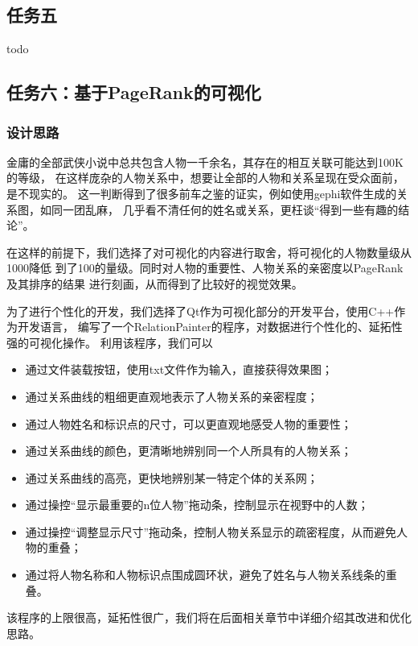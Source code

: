 \documentclass[a4paper,UTF8]{article}
\numberwithin{equation}{section}
\begin{document}
\subsection{任务五}
todo

\subsection{任务六：基于PageRank的可视化}
\subsubsection{设计思路}
金庸的全部武侠小说中总共包含人物一千余名，其存在的相互关联可能达到100K的等级，
在这样庞杂的人物关系中，想要让全部的人物和关系呈现在受众面前，是不现实的。
这一判断得到了很多前车之鉴的证实，例如使用gephi软件生成的关系图，如同一团乱麻，
几乎看不清任何的姓名或关系，更枉谈“得到一些有趣的结论”。
\par 在这样的前提下，我们选择了对可视化的内容进行取舍，将可视化的人物数量级从1000降低
到了100的量级。同时对人物的重要性、人物关系的亲密度以PageRank及其排序的结果
进行刻画，从而得到了比较好的视觉效果。
\par 为了进行个性化的开发，我们选择了Qt作为可视化部分的开发平台，使用C++作为开发语言，
编写了一个RelationPainter的程序，对数据进行个性化的、延拓性强的可视化操作。
利用该程序，我们可以
\begin{itemize}
    \item 通过文件装载按钮，使用txt文件作为输入，直接获得效果图；
    \item 通过关系曲线的粗细更直观地表示了人物关系的亲密程度；
    \item 通过人物姓名和标识点的尺寸，可以更直观地感受人物的重要性；
    \item 通过关系曲线的颜色，更清晰地辨别同一个人所具有的人物关系；
    \item 通过关系曲线的高亮，更快地辨别某一特定个体的关系网；
    \item 通过操控“显示最重要的n位人物”拖动条，控制显示在视野中的人数；
    \item 通过操控“调整显示尺寸”拖动条，控制人物关系显示的疏密程度，从而避免人物的重叠；
    \item 通过将人物名称和人物标识点围成圆环状，避免了姓名与人物关系线条的重叠。
\end{itemize}
该程序的上限很高，延拓性很广，我们将在后面相关章节中详细介绍其改进和优化思路。
\end{document}
